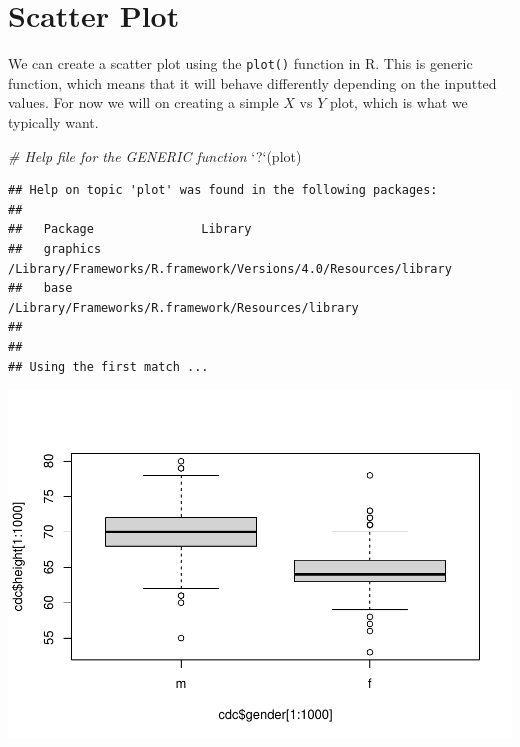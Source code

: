 \documentclass[
]{book}
\newenvironment{Shaded}{\begin{snugshade}}{\end{snugshade}}
\newcommand{\CommentTok}[1]{\textcolor[rgb]{0.56,0.35,0.01}{\textit{#1}}}
\newcommand{\DataTypeTok}[1]{\textcolor[rgb]{0.13,0.29,0.53}{#1}}
\newcommand{\KeywordTok}[1]{\textcolor[rgb]{0.13,0.29,0.53}{\textbf{#1}}}
\newcommand{\NormalTok}[1]{#1}
\newcommand{\OperatorTok}[1]{\textcolor[rgb]{0.81,0.36,0.00}{\textbf{#1}}}
\newcommand{\StringTok}[1]{\textcolor[rgb]{0.31,0.60,0.02}{#1}}
\begin{document}
\hypertarget{scatter-plot}{%
\section{Scatter Plot}\label{scatter-plot}}

We can create a scatter plot using the \texttt{plot()} function in R. This is generic function, which means that it will behave differently depending on the inputted values. For now we will on creating a simple \(X\) vs \(Y\) plot, which is what we typically want.

\begin{Shaded}
\begin{Highlighting}[]
\CommentTok{# Help file for the GENERIC function}
\StringTok{`}\DataTypeTok{?}\StringTok{`}\NormalTok{(plot)}
\end{Highlighting}
\end{Shaded}

\begin{verbatim}
## Help on topic 'plot' was found in the following packages:
## 
##   Package               Library
##   graphics              /Library/Frameworks/R.framework/Versions/4.0/Resources/library
##   base                  /Library/Frameworks/R.framework/Resources/library
## 
## 
## Using the first match ...
\end{verbatim}

\begin{Shaded}
\end{Shaded}

\includegraphics{_main_files/figure-latex/unnamed-chunk-178-1.pdf}
\end{document}

